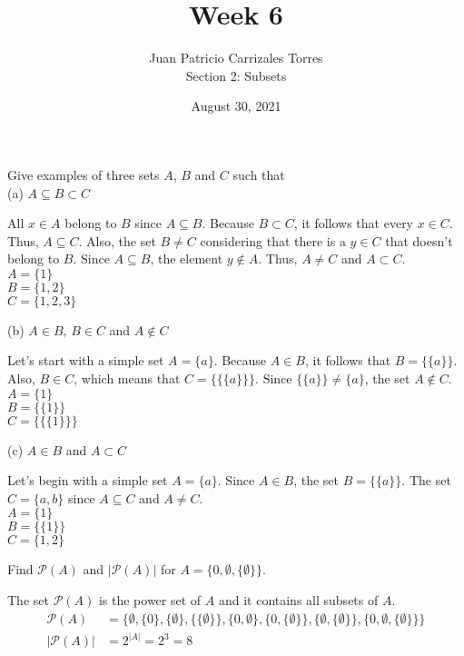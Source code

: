 \documentclass[12pt]{article}
\newenvironment{problem}[2][Problem]{\begin{trivlist}
		\item[\hskip \labelsep {\bfseries #1}\hskip \labelsep {\bfseries #2.}]}{\end{trivlist}}
\newenvironment{solution}[2][Solution]{\begin{trivlist}
		\item[\hskip \labelsep {\bfseries #1}\hskip \labelsep {\bfseries #2.}]}{\end{trivlist}}
\begin{document}
	
	\title{Week 6}
	\author{Juan Patricio Carrizales Torres \\
		Section 2: Subsets}
	\date{August 30, 2021}
	\maketitle

\begin{problem}{10}
	Give examples of three sets $A$, $B$ and $C$ such that\\
	
	(a) $A \subseteq B \subset C$
	\begin{solution}{a} All $x \in A$ belong to $B$ since $A\subseteq B$. Because $B \subset C$, it follows that every $x \in C$. Thus, $A \subseteq C$. Also, the set $B\neq C$ considering that there is a $y\in C$ that doesn't belong to $B$. Since $A \subseteq B$, the element $y \notin A$. Thus, $A \neq C$ and $A \subset C$.\\
		$A=\{1\}$\\ $B=\{1,2\}$\\ $C=\{1,2,3\}$
	\end{solution}
	(b) $A \in B$, $B \in C$ and $A \notin C$
	\begin{solution}{b}
		Let's start with a simple set $A=\{a\}$. Because $A \in B$, it follows that $B=\{\{a\}\}$. Also, $B\in C$, which means that $C=\{\{\{a\}\}\}$. Since $\{\{a\}\} \neq \{a\}$, the set $A \notin C$.\\
		$A=\{1\}$\\
		$B=\{\{1\}\}$\\
		$C=\{\{\{1\}\}\}$
	\end{solution}
	(c) $A\in B$ and $A\subset C$
	\begin{solution}{c}
		Let's begin with a simple set $A=\{a\}$. Since $A\in B$, the set $B=\{\{a\}\}$. The set $C=\{a,b\}$ since $A\subseteq C$ and $A\neq C$.\\
		$A=\{1\}$\\
		$B=\{\{1\}\}$\\
		$C=\{1,2\}$
	\end{solution}
\end{problem}

\begin{problem}{17}
	Find $\mathcal{P}(A)$ and $|\mathcal{P}(A)|$ for $A=\{0,\emptyset,\{\emptyset\}\}$.
	\begin{solution}{}
		The set $\mathcal{P}(A)$ is the power set of $A$ and it contains all subsets of $A$.
		\begin{align*}
			\mathcal{P}(A)&=\{\emptyset,\{0\},\{\emptyset\},\{\{\emptyset\}\},\{0,\emptyset\},\{0,\{\emptyset\}\},\{\emptyset,\{\emptyset\}\},\{0,\emptyset,\{\emptyset\}\}\}\\
			|\mathcal{P}(A)|&=2^{|A|}=2^{3}=8
		\end{align*}
	\end{solution}
\end{problem}
\end{document}
